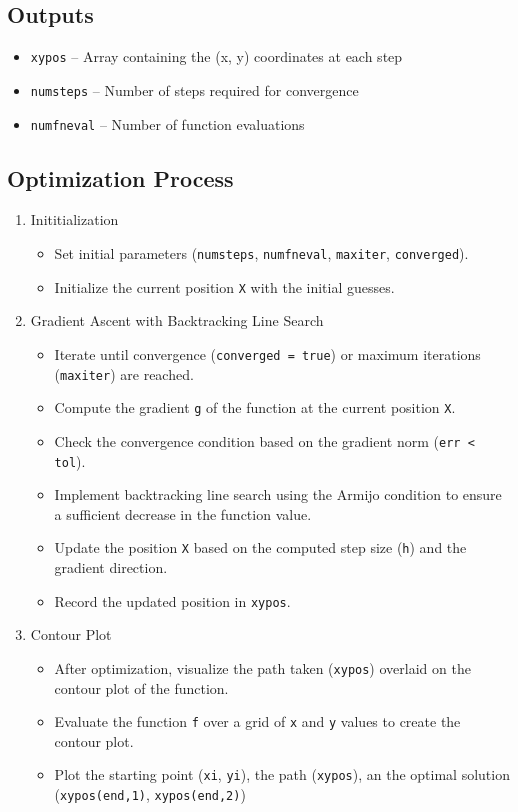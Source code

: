 \documentclass{article}
\newcommand{\mat}[1]{\lstinline[style=matlabstyle]|#1|}
\begin{document}
\subsection{Outputs}
\begin{itemize}
    \item \mat{xypos} --  Array containing the (x, y) coordinates at each step
    \item \mat{numsteps} -- Number of steps required for convergence
    \item \mat{numfneval} -- Number of function evaluations
\end{itemize}

\subsection{Optimization Process}
\begin{enumerate}
    \item Inititialization
        \begin{itemize}
            \item Set initial parameters (\mat{numsteps}, \mat{numfneval}, \mat{maxiter}, \mat{converged}).
            \item Initialize the current position \mat{X} with the initial guesses.
        \end{itemize}
    \item Gradient Ascent with Backtracking Line Search
        \begin{itemize}
            \item Iterate until convergence (\mat{converged = true}) or maximum iterations (\mat{maxiter}) are reached.
            \item Compute the gradient \mat{g} of the function at the current position \mat{X}.
            \item Check the convergence condition based on the gradient norm (\mat{err < tol}).
            \item Implement backtracking line search using the Armijo condition to ensure a sufficient decrease in the function value.
            \item Update the position \mat{X} based on the computed step size (\mat{h}) and the gradient direction.
            \item Record the updated position in \mat{xypos}.
        \end{itemize}
    \item Contour Plot
        \begin{itemize}
            \item After optimization, visualize the path taken (\mat{xypos}) overlaid on the contour plot of the function.
            \item Evaluate the function \mat{f} over a grid of \mat{x} and \mat{y} values to create the contour plot.
            \item Plot the starting point (\mat{xi}, \mat{yi}), the path (\mat{xypos}), an the optimal solution (\mat{xypos(end,1)}, \mat{xypos(end,2)})
        \end{itemize}
\end{enumerate}
\end{document}
